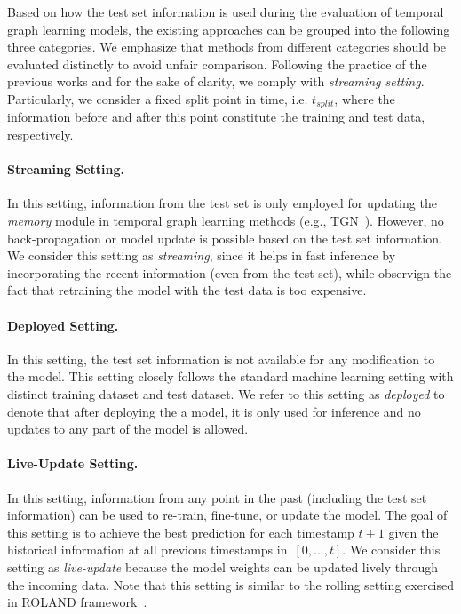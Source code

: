 Based on how the test set information is used during the evaluation of temporal graph learning models, the existing approaches can be grouped into the following three categories.
We emphasize that methods from different categories should be evaluated distinctly to avoid unfair comparison. 
Following the practice of the previous works and for the sake of clarity, we comply with \emph{streaming setting}.
Particularly, we consider a fixed split point in time, i.e. \textit{$t_{split}$}, where the information before and after this point constitute the training and test data, respectively.

\paragraph{Streaming Setting.} In this setting, information from the test set is only employed for updating the \textit{memory} module in temporal graph learning methods (e.g., TGN~\cite{rossi2020temporal}). 
However, no back-propagation or model update is possible based on the test set information. 
We consider this setting as \textit{streaming}, since it helps in fast inference by incorporating the recent information (even from the test set), while observign the fact that retraining the model with the test data is too expensive.
 
\paragraph{Deployed Setting.} In this setting, the test set information is not available for any modification to the model. 
This setting closely follows the standard machine learning setting with distinct training dataset and test dataset. We refer to this setting as \textit{deployed} to denote that after deploying the a model, it is only used for inference and no updates to any part of the model is allowed. 

\paragraph{Live-Update Setting.} In this setting, information from any point in the past (including the test set information) can be used to re-train, fine-tune, or update the model. 
The goal of this setting is to achieve the best prediction for each timestamp \textit{$t+1$} given the historical information at all previous timestamps in~\textit{$[0,...,t]$}. 
We consider this setting as \textit{live-update} because the model weights can be updated lively through the incoming data.
Note that this setting is similar to the rolling setting exercised in ROLAND framework~\cite{you2022roland}.

